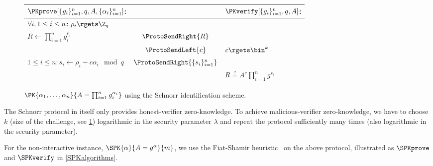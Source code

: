 \begin{figure*}
  \centering
  \begin{tabular}{lcl}
    \(\PKprove[\{g_i\}_{i=1}^n, q, A, \{\alpha_i\}_{i=1}^n]\):
    &
    & \(\PKverify[\{g_i\}_{i=1}^n, q, A]\):
    \\
    \midrule

    \(\forall i, 1\leq i\leq n\colon \rho_i\rgets \Z_q\)
    &
    &
    \\

    \(R\gets \prod_{i=1}^n g_i^{\rho_i}\)
    & \(\ProtoSendRight{R}\)
    &
    \\

    & \(\ProtoSendLeft{c}\)
    & \(c\rgets \bin^k\)
    \\

    \(1\leq i\leq n\colon s_i\gets \rho_i - c\alpha_i \mod q\)
    & \(\ProtoSendRight{\{s_i\}_{i=1}^n}\)
    &
    \\

    &
    & \(R \stackrel{?}{=} A^c \prod_{i=1}^n g^{s_i}\)
    \\
    
  \end{tabular}
  \caption{%
    \(\PK{\alpha_1, \dotsc, \alpha_n}{A = \prod_{i=1}^n g_i^{\alpha_i}}\) using 
    the Schnorr identification scheme.
  }%
  \label{PKalgorithms}
\end{figure*}

The Schnorr protocol in itself only provides honest-verifier zero-knowledge.
To achieve malicious-verifier zero-knowledge, we have to choose \(k\) (size of 
the challenge, see \cref{PKalgorithms}) logarithmic in the security parameter 
\(\lambda\) and repeat the protocol sufficiently many times (also logarithmic in 
the security parameter).


For the non-interactive instance, \(\SPK{\alpha}{A = g^\alpha}{m}\), we use the 
Fiat-Shamir heuristic~\cite{FiatShamirHeuristic} on the above protocol, 
illustrated as \(\SPKprove\) and \(\SPKverify\) in \cref{SPKalgorithms}.

